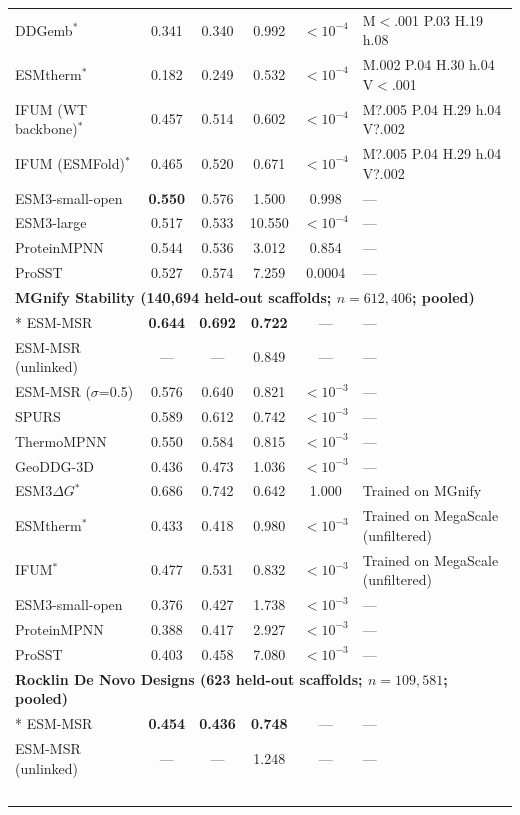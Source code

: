 {\begin{longtable}{lccccl}
DDGemb$^*$ & 0.341 & 0.340 & 0.992 & $<10^{-4}$ & M$<$.001 P.03 H.19 h.08 \\
ESMtherm$^*$ & 0.182 & 0.249 & 0.532 & $<10^{-4}$ & M.002 P.04 H.30 h.04 V$<$.001 \\
IFUM (WT backbone)$^*$ & 0.457 & 0.514 & 0.602 & $<10^{-4}$ & M?.005 P.04 H.29 h.04 V?.002 \\
IFUM (ESMFold)$^*$ & 0.465 & 0.520 & 0.671 & $<10^{-4}$ & M?.005 P.04 H.29 h.04 V?.002 \\
ESM3-small-open & \textbf{0.550} & 0.576 & 1.500 & 0.998 & --- \\
ESM3-large & 0.517 & 0.533 & 10.550 & $<10^{-4}$ & --- \\
ProteinMPNN & 0.544 & 0.536 & 3.012 & 0.854 & --- \\
ProSST & 0.527 & 0.574 & 7.259 & 0.0004 & --- \\
\midrule
\multicolumn{6}{l}{\textbf{MGnify Stability (140,694 held-out scaffolds; $n=612{,}406$; pooled)}} \\*
\midrule
ESM-MSR & \textbf{0.644} & \textbf{0.692} & \textbf{0.722} & --- & --- \\
ESM-MSR (unlinked) & --- & --- & 0.849 & --- & --- \\
ESM-MSR ($\sigma$=0.5) & 0.576 & 0.640 & 0.821 & $<10^{-3}$ & --- \\
SPURS & 0.589 & 0.612 & 0.742 & $<10^{-3}$ & --- \\
ThermoMPNN & 0.550 & 0.584 & 0.815 & $<10^{-3}$ & --- \\
GeoDDG-3D & 0.436 & 0.473 & 1.036 & $<10^{-3}$ & --- \\
ESM3$\Delta G$$^*$ & 0.686 & 0.742 & 0.642 & 1.000 & Trained on MGnify \\
ESMtherm$^*$ & 0.433 & 0.418 & 0.980 & $<10^{-3}$ & Trained on MegaScale (unfiltered) \\
IFUM$^*$ & 0.477 & 0.531 & 0.832 & $<10^{-3}$ & Trained on MegaScale (unfiltered) \\
ESM3-small-open & 0.376 & 0.427 & 1.738 & $<10^{-3}$ & --- \\
ProteinMPNN & 0.388 & 0.417 & 2.927 & $<10^{-3}$ & --- \\
ProSST & 0.403 & 0.458 & 7.080 & $<10^{-3}$ & --- \\
\midrule
\multicolumn{6}{l}{\textbf{Rocklin De Novo Designs (623 held-out scaffolds; $n=109{,}581$; pooled)}} \\*
\midrule
ESM-MSR & \textbf{0.454} & \textbf{0.436} & \textbf{0.748} & --- & --- \\
ESM-MSR (unlinked) & --- & --- & 1.248 & --- & --- \\
$$
\end{longtable}}
